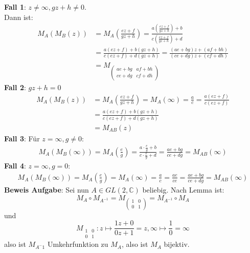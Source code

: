 \begin{solution}
  \textbf{Fall 1}: \( z \neq \infty, gz+h \neq 0 \). \\
  Dann ist:
  \begin{align*}
    M_A(M_B(z)) &= M_A\left(\frac{ez+f}{gz+h} \right) = \frac{a(\frac{ez+f}{gz+h}) + b}{c(\frac{ez+f}{gz+h}) + d} \\
    &= \frac{a(ez+f)+b(gz+h)}{c(ez+f)+d(gz+h)} = \frac{(ae+bg)z + (af+bh)}{(ce+dg)z + (cf +dh)} \\
    &= M_{\left(\begin{smallmatrix}
      ae+bg & af+bh \\
      ce+dg & cf+dh 
    \end{smallmatrix} \right)}
  \end{align*}
  \textbf{Fall 2}: \( gz+h = 0 \) \\
  \begin{align*}
    M_A(M_B(z)) &= M_A\left(\frac{ez+f}{gz+h} \right) = M_A(\infty) = \frac{a}{c} = \frac{a(ez+f)}{c(ez+f)} \\
    &= \frac{a(ez+f) + b(gz+h)}{c(ez+f)+d(gz+h)} \\
    &= M_{AB}(z)
  \end{align*}
  \textbf{Fall 3}: Für \( z = \infty, g \neq 0 \): 
  \begin{align*}
    M_A(M_B(\infty)) = M_A\left(\frac{e}{g} \right) = \frac{a \cdot \frac{e}{g} + b}{c \cdot \frac{e}{g} + d}
    = \frac{ae + bg}{ce+dg} = M_{AB}(\infty) 
  \end{align*}
  \textbf{Fall 4}: \( z = \infty, g = 0: \) 
  \begin{align*}
    M_A(M_B(\infty)) = M_A\left(\frac{e}{g} \right) = M_A(\infty) = \frac{a}{c} = \frac{ae}{ce} = \frac{ae + bg}{ce + dg} = M_{AB}(\infty) 
  \end{align*}
  \textbf{Beweis Aufgabe}: Sei nun \( A \in GL(2,\mathbb{C}) \) beliebig. Nach Lemma ist:
  \begin{equation*}
    M_A \circ M_{A^{-1}} = M_{\left(\begin{smallmatrix}
      1 & 0 \\
      0 & 1 
    \end{smallmatrix} \right)} = M_{A^{-1}} \circ M_A
  \end{equation*}
  und 
  \begin{equation*}
    M_{\begin{smallmatrix}
      1 & 0 \\
      0 & 1 
    \end{smallmatrix}} : z \mapsto \frac{1z+0}{0z+1} = z, \infty \mapsto \frac{1}{0} = \infty 
  \end{equation*}
  also ist \( M_{A^-1} \) Umkehrfunktion zu \( M_A \), also ist \( M_A \) bijektiv. \\
\end{solution}


